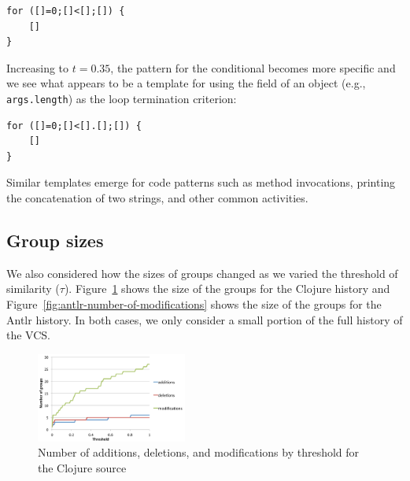 \begin{verbatim}
for ([]=0;[]<[];[]) {
    []
}
\end{verbatim}

Increasing to $t=0.35$, the pattern for the conditional becomes more specific
and we see what appears to be a template for using the field of an object
(e.g., {\tt args.length}) as the loop termination criterion:

\begin{verbatim}
for ([]=0;[]<[].[];[]) {
    []
}
\end{verbatim}

Similar templates emerge for code patterns such as method invocations, printing
the concatenation of two strings, and other common activities.  


\subsection{Group sizes}


We also considered how the sizes of groups changed as we varied the threshold
of similarity ($\tau$). Figure~\ref{fig:clojure-number-of-modifications} shows
the size of the groups for the Clojure history and
Figure~\ref{fig:antlr-number-of-modifications} shows the size of the groups for
the Antlr history. In both cases, we only consider a small portion of the full
history of the VCS.

\begin{figure}
\begin{center}
\includegraphics[width=0.44\textwidth]{figures/clojure-number-of-modifications.pdf}
\caption{Number of additions, deletions, and modifications by threshold for the Clojure source}
\label{fig:clojure-number-of-modifications}
\end{center}
\end{figure}

